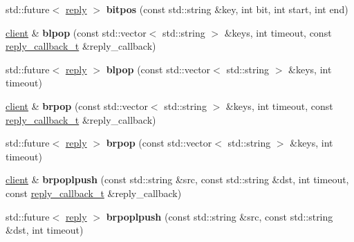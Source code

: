 \begin{DoxyCompactItemize}
\item 
\mbox{\label{classcpp__redis_1_1client_a43b5121105276ccae731bb6093c80e02}} 
std\+::future$<$ \hyperlink{classcpp__redis_1_1reply}{reply} $>$ {\bfseries bitpos} (const std\+::string \&key, int bit, int start, int end)
\item 
\mbox{\label{classcpp__redis_1_1client_a432c2677b13dc8e2a9d7afe7eade39e3}} 
\hyperlink{classcpp__redis_1_1client}{client} \& {\bfseries blpop} (const std\+::vector$<$ std\+::string $>$ \&keys, int timeout, const \hyperlink{classcpp__redis_1_1client_a061a1140d36d2eaeda82b09a0bb3f9f2}{reply\+\_\+callback\+\_\+t} \&reply\+\_\+callback)
\item 
\mbox{\label{classcpp__redis_1_1client_ac54c987bca4efb4bf6659b063f19d5ff}} 
std\+::future$<$ \hyperlink{classcpp__redis_1_1reply}{reply} $>$ {\bfseries blpop} (const std\+::vector$<$ std\+::string $>$ \&keys, int timeout)
\item 
\mbox{\label{classcpp__redis_1_1client_adc565332168e31ebbd762f2cb12ad4d1}} 
\hyperlink{classcpp__redis_1_1client}{client} \& {\bfseries brpop} (const std\+::vector$<$ std\+::string $>$ \&keys, int timeout, const \hyperlink{classcpp__redis_1_1client_a061a1140d36d2eaeda82b09a0bb3f9f2}{reply\+\_\+callback\+\_\+t} \&reply\+\_\+callback)
\item 
\mbox{\label{classcpp__redis_1_1client_aa123b931c6d00027d08f0fcbde2f026e}} 
std\+::future$<$ \hyperlink{classcpp__redis_1_1reply}{reply} $>$ {\bfseries brpop} (const std\+::vector$<$ std\+::string $>$ \&keys, int timeout)
\item 
\mbox{\label{classcpp__redis_1_1client_afa7fb97bb0b30c2c78a605f48b6144e2}} 
\hyperlink{classcpp__redis_1_1client}{client} \& {\bfseries brpoplpush} (const std\+::string \&src, const std\+::string \&dst, int timeout, const \hyperlink{classcpp__redis_1_1client_a061a1140d36d2eaeda82b09a0bb3f9f2}{reply\+\_\+callback\+\_\+t} \&reply\+\_\+callback)
\item 
\mbox{\label{classcpp__redis_1_1client_aa30b9303ee0d59b07dd656db2426547e}} 
std\+::future$<$ \hyperlink{classcpp__redis_1_1reply}{reply} $>$ {\bfseries brpoplpush} (const std\+::string \&src, const std\+::string \&dst, int timeout)

\end{DoxyCompactItemize}
